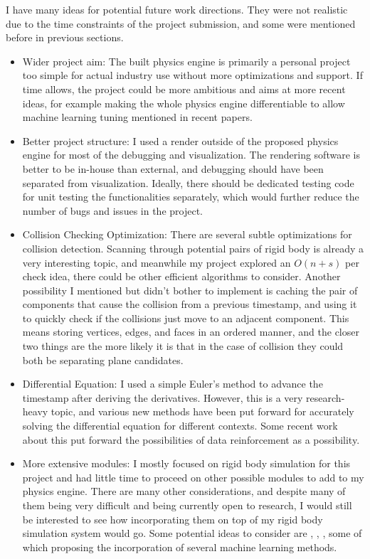 \documentclass[12pt,a4paper,twoside,openright]{report}
\begin{document}
I have many ideas for potential future work directions. They were not realistic due to the time constraints of the project submission, and some were mentioned before in previous sections.

\begin{itemize}
\item Wider project aim: The built physics engine is primarily a personal project too simple for actual industry use without more optimizations and support. If time allows, the project could be more ambitious and aims at more recent ideas, for example making the whole physics engine differentiable to allow machine learning tuning mentioned in recent papers\cite{degrave2019differentiable}. 
\item Better project structure: I used a render outside of the proposed physics engine for most of the debugging and visualization. The rendering software is better to be in-house than external, and debugging should have been separated from visualization. Ideally, there should be dedicated testing code for unit testing the functionalities separately, which would further reduce the number of bugs and issues in the project.
\item Collision Checking Optimization: There are several subtle optimizations for collision detection. Scanning through potential pairs of rigid body is already a very interesting topic, and meanwhile my project explored an $O(n + s)$ per check idea, there could be other efficient algorithms to consider. Another possibility I mentioned but didn't bother to implement is caching the pair of components that cause the collision from a previous timestamp, and using it to quickly check if the collisions just move to an adjacent component. This means storing vertices, edges, and faces in an ordered manner, and the closer two things are the more likely it is that in the case of collision they could both be separating plane candidates.
\item Differential Equation: I used a simple Euler's method to advance the timestamp after deriving the derivatives. However, this is a very research-heavy topic, and various new methods have been put forward for accurately solving the differential equation for different contexts. Some recent work about this put forward the possibilities of data reinforcement\cite{koch2021data} as a possibility.
\item More extensive modules: I mostly focused on rigid body simulation for this project and had little time to proceed on other possible modules to add to my physics engine. There are many other considerations, and despite many of them being very difficult and being currently open to research, I would still be interested to see how incorporating them on top of my rigid body simulation system would go. Some potential ideas to consider are \cite{vinuesa2022enhancing}, \cite{obiols2020cfdnet}, \cite{li2022contact}, some of which proposing the incorporation of several machine learning methods.

\end{itemize}
\end{document}
